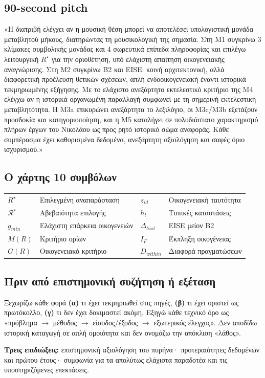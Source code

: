 \documentclass[9pt,a4paper]{extarticle}
\begin{document}
\subsection*{90-second pitch}
\begin{keybox}
«Η διατριβή ελέγχει αν η μουσική θέση μπορεί να αποτελέσει υπολογιστική μονάδα μεταβλητού μήκους, διατηρώντας τη μουσικολογική της σημασία. Στη M1 συγκρίνω 3 κλίμακες συμβολικής μονάδας και 4 σωρευτικά επίπεδα πληροφορίας και επιλέγω λειτουργική \(R^\star\) για την οριοθέτηση, υπό ελάχιστη απαίτηση οικογενειακής αναγνώρισης. Στη M2 συγκρίνω B2 και EISE: κοινή αρχιτεκτονική, αλλά διαφορετική προέλευση θετικών σχέσεων, απλή ενδοοικογενειακή έναντι ιστορικά τεκμηριωμένης εξήγησης. Με το ελάχιστο ανεξάρτητο εκτελεστικό κριτήριο της M4 ελέγχω αν η ιστορικά οργανωμένη παραλλαγή συμφωνεί με τη σημερινή εκτελεστική μεταβλητότητα. Η M3a επικυρώνει ανεξάρτητα το λεξιλόγιο, οι M3c/M3b εξετάζουν προσδοκία και κατηγοριοποίηση, και η M5 καταλήγει σε πολυδιάστατο χαρακτηρισμό πλήρων έργων του Νικολάου ως προς ρητό ιστορικό σώμα αναφοράς. Κάθε συμπέρασμα έχει καθορισμένα δεδομένα, ανεξάρτητη αξιολόγηση και σαφές όριο ισχυρισμού.»
\end{keybox}
\subsection*{Ο χάρτης 10 συμβόλων}
\begin{tabularx}{\linewidth}{>{\bfseries}p{2.3cm}X>{\bfseries}p{2.5cm}X}
\(R^\star\) & Επιλεγμένη αναπαράσταση & \(z_{id}\) & Οικογενειακή ταυτότητα\\
\(\mathcal R^\star\) & Αβεβαιότητα επιλογής & \(h_t\) & Τοπικές καταστάσεις\\
\(g_{min}\) & Ελάχιστη επάρκεια οικογενειών & \(\Delta_{hist}\) & EISE μείον B2\\
\(M(R)\) & Κριτήριο ορίων & \(I_F\) & Έκπληξη οικογένειας\\
\(G(R)\) & Οικογενειακό κριτήριο & \(D_{within}\) & Διαφορά πραγματώσεων\\
\end{tabularx}
\subsection*{Πριν από επιστημονική συζήτηση ή εξέταση}
Ξεχωρίζω κάθε φορά \textbf{(α)} τι έχει τεκμηριωθεί στις πηγές, \textbf{(β)} τι έχει οριστεί ως πρωτόκολλο, \textbf{(γ)} τι δεν έχει δοκιμαστεί ακόμη. Εξηγώ κάθε τεχνικό όρο ως «πρόβλημα \(\rightarrow\) μέθοδος \(\rightarrow\) είσοδος/έξοδος \(\rightarrow\) εξωτερικός έλεγχος». Δεν αποδίδω ιστορική καταγωγή σε απλή ομοιότητα και δεν ονομάζω την απόκλιση «λάθος». 
\begin{warnbox}
\textbf{Τρεις επιδιώξεις:} επιστημονική αξιολόγηση του πυρήνα· προτεραιότητες δεδομένων και πρώτου έτους· συμφωνία για τα απολύτως ελάχιστα παραδοτέα και τις υποστηριζόμενες επεκτάσεις.
\end{warnbox}
\newpage
\end{document}
